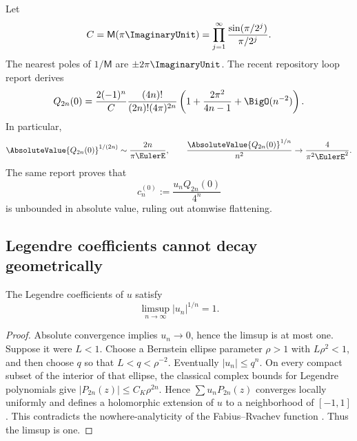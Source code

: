 \documentclass[11pt,oneside]{article}
\numberwithin{equation}{section}
\theoremstyle{definition}
\theoremstyle{remark}
\newcommand{\MM}{\mathsf M}
\begin{document}
Let
\begin{equation}
 C=\MM(\pi\ImaginaryUnit)
 =\prod_{j=1}^{\infty}\frac{\sin(\pi/2^j)}{\pi/2^j}.
 \label{eq:C-constant}
\end{equation}
The nearest poles of $1/\MM$ are $\pm2\pi\ImaginaryUnit$.  The recent repository loop
report derives
\begin{equation}
 Q_{2n}(0)=
 \frac{2(-1)^n}{C}\frac{(4n)!}{(2n)!(4\pi)^{2n}}
 \left(1+\frac{2\pi^2}{4n-1}+\BigO(n^{-2})\right).
 \label{eq:Q0-asymptotic}
\end{equation}
In particular,
\begin{equation}
 \AbsoluteValue{Q_{2n}(0)}^{1/(2n)}\sim\frac{2n}{\pi\EulerE},
 \qquad
 \frac{\AbsoluteValue{Q_{2n}(0)}^{1/n}}{n^2}\to\frac{4}{\pi^2\EulerE^2}.
 \label{eq:Q0-root}
\end{equation}
The same report proves that
\begin{equation}
 c_n^{(0)}:=\frac{u_nQ_{2n}(0)}{4^n}
 \label{eq:central-coefficient}
\end{equation}
is unbounded in absolute value, ruling out atomwise flattening.

\subsection{Legendre coefficients cannot decay geometrically}

\begin{lemma}
\label{lem:un-root}
The Legendre coefficients of $u$ satisfy
\begin{equation}
 \boxed{
 \limsup_{n\to\infty}|u_n|^{1/n}=1.}
 \label{eq:un-root}
\end{equation}
\end{lemma}

\begin{proof}
Absolute convergence implies $u_n\to0$, hence the limsup is at most one.
Suppose it were $L<1$.  Choose a Bernstein ellipse parameter $\rho>1$ with
$L\rho^2<1$, and then choose $q$ so that $L<q<\rho^{-2}$.  Eventually
$|u_n|\le q^n$.  On every compact subset of the interior of that ellipse, the
classical complex bounds for Legendre polynomials give
$|P_{2n}(z)|\le C_K\rho^{2n}$.  Hence $\sum u_nP_{2n}(z)$ converges locally
uniformly and defines a holomorphic extension of $u$ to a neighborhood of
$[-1,1]$.  This contradicts the nowhere-analyticity of the Fabius--Rvachev
function \cite{Fabius1966}.  Thus the limsup is one.
\end{proof}
\end{document}
